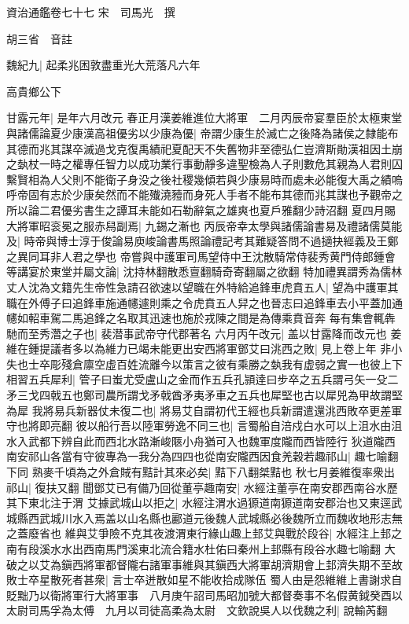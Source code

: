 資治通鑑卷七十七
宋　司馬光　撰

胡三省　音註

魏紀九|{
	起柔兆困敦盡重光大荒落凡六年}


高貴鄉公下

甘露元年|{
	是年六月改元}
春正月漢姜維進位大將軍　二月丙辰帝宴羣臣於太極東堂與諸儒論夏少康漢高祖優劣以少康為優|{
	帝謂少康生於滅亡之後降為諸侯之隸能布其德而兆其謀卒滅過戈克復禹績祀夏配天不失舊物非至德弘仁豈濟斯勛漢祖因土崩之埶杖一時之權專任智力以成功業行事動靜多違聖檢為人子則數危其親為人君則囚繫賢相為人父則不能衛子身没之後社稷幾傾若與少康易時而處未必能復大禹之績嗚呼帝固有志於少康矣然而不能殱澆豷而身死人手者不能布其德而兆其謀也予觀帝之所以論二君優劣書生之譚耳未能如石勒辭氣之雄爽也夏戶雅翻少詩沼翻}
夏四月賜大將軍昭衮冕之服赤舄副焉|{
	九錫之漸也}
丙辰帝幸太學與諸儒論書易及禮諸儒莫能及|{
	時帝與博士淳于俊論易庾峻論書馬照論禮記考其難疑答問不過擿抉經義及王鄭之異同耳非人君之學也}
帝嘗與中護軍司馬望侍中王沈散騎常侍裴秀黄門侍郎鍾會等講宴於東堂并屬文論|{
	沈持林翻散悉亶翻騎奇寄翻屬之欲翻}
特加禮異謂秀為儒林丈人沈為文籍先生帝性急請召欲速以望職在外特給追鋒車虎賁五人|{
	望為中護軍其職在外傅子曰追鋒車施通幰遽則乘之令虎賁五人舁之也晉志曰追鋒車去小平蓋加通幰如軺車駕二馬追鋒之名取其迅速也施於戎陳之間是為傳乘賁音奔}
每有集會輒犇馳而至秀濳之子也|{
	裴潜事武帝守代郡著名}
六月丙午改元|{
	盖以甘露降而改元也}
姜維在鍾提議者多以為維力已竭未能更出安西將軍鄧艾曰洮西之敗|{
	見上卷上年}
非小失也士卒彫殘倉廪空虛百姓流離今以策言之彼有乘勝之埶我有虚弱之實一也彼上下相習五兵犀利|{
	管子曰蚩尤受盧山之金而作五兵孔頴逹曰步卒之五兵謂弓矢一殳二矛三戈四戟五也鄭司農所謂戈矛戟酋矛夷矛車之五兵也犀堅也古以犀兕為甲故謂堅為犀}
我將易兵新器仗未復二也|{
	將易艾自謂初代王經也兵新謂遣還洮西敗卒更差軍守也將即亮翻}
彼以船行吾以陸軍勞逸不同三也|{
	言蜀船自涪戍白水可以上沮水由沮水入武都下辨自此而西北水路漸峻陿小舟猶可入也魏軍度隴而西皆陸行}
狄道隴西南安祁山各當有守彼專為一我分為四四也從南安隴西因食羌穀若趣祁山|{
	趣七喻翻下同}
熟麥千頃為之外倉賊有黠計其來必矣|{
	黠下八翻桀黠也}
秋七月姜維復率衆出祁山|{
	復扶又翻}
聞鄧艾已有備乃回從董亭趣南安|{
	水經注董亭在南安郡西南谷水歷其下東北注于渭}
艾據武城山以拒之|{
	水經注渭水過獂道南獂道南安郡治也又東逕武城縣西武城川水入焉盖以山名縣也酈道元後魏人武城縣必後魏所立而魏收地形志無之蓋廢省也}
維與艾爭險不克其夜渡渭東行緣山趣上邽艾與戰於段谷|{
	水經注上邽之南有段溪水水出西南馬門溪東北流合籍水杜佑曰秦州上邽縣有段谷水趣七喻翻}
大破之以艾為鎭西將軍都督隴右諸軍事維與其鎭西大將軍胡濟期會上邽濟失期不至故敗士卒星散死者甚衆|{
	言士卒迸散如星不能收拾成隊伍}
蜀人由是怨維維上書謝求自貶黜乃以衛將軍行大將軍事　八月庚午詔司馬昭加號大都督奏事不名假黄鉞癸酉以太尉司馬孚為太傅　九月以司徒高柔為太尉　文欽說吳人以伐魏之利|{
	說輸芮翻}
